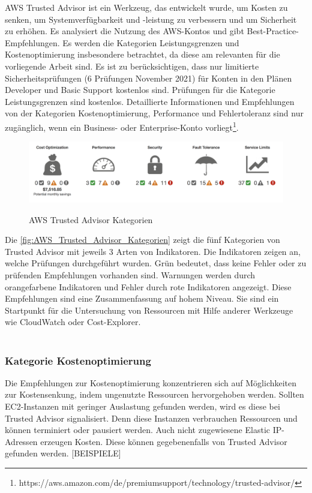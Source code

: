 AWS Trusted Advisor ist ein Werkzeug, das entwickelt wurde, um Kosten zu senken, um Systemverfügbarkeit und -leistung zu verbessern und um Sicherheit zu erhöhen. Es analysiert die Nutzung des AWS-Kontos und gibt Best-Practice-Empfehlungen. Es werden die Kategorien Leistungsgrenzen und Kostenoptimierung insbesondere betrachtet, da diese am relevanten für die vorliegende Arbeit sind. Es ist zu berücksichtigen, dass nur limitierte Sicherheitsprüfungen (6 Prüfungen November 2021) für Konten in den Plänen Developer und Basic Support kostenlos sind. Prüfungen für die Kategorie Leistungsgrenzen sind kostenlos. Detaillierte Informationen und Empfehlungen von der Kategorien Kostenoptimierung, Performance und Fehlertoleranz sind nur zugänglich, wenn ein Business- oder Enterprise-Konto vorliegt\footnote{https://aws.amazon.com/de/premiumsupport/technology/trusted-advisor/}. \\

\begin{figure}[h!]
      \centering
      \includegraphics[scale=0.4]{sources/AWS_Trusted_Advisor_Kategorien}
      \caption[AWS Trusted Advisor Kategorien]{}
      \label{fig:AWS_Trusted_Advisor_Kategorien} 
      AWS Trusted Advisor Kategorien\cite{AMZ20}
\end{figure}
Die \autoref{fig:AWS_Trusted_Advisor_Kategorien} zeigt die fünf Kategorien von Trusted Advisor mit jeweils 3 Arten von Indikatoren. Die Indikatoren zeigen an, welche Prüfungen durchgeführt wurden. Grün bedeutet, dass keine Fehler oder zu prüfenden Empfehlungen vorhanden sind. Warnungen werden durch orangefarbene Indikatoren und Fehler durch rote Indikatoren angezeigt. Diese Empfehlungen sind eine Zusammenfassung auf hohem Niveau. Sie sind ein Startpunkt für die Untersuchung von Ressourcen mit Hilfe anderer Werkzeuge wie CloudWatch oder Cost-Explorer.%
\\\\

\subsubsection*{Kategorie Kostenoptimierung}
Die Empfehlungen zur Kostenoptimierung konzentrieren sich auf Möglichkeiten zur Kostensenkung, indem ungenutzte Ressourcen hervorgehoben werden. 
Sollten EC2-Instanzen mit geringer Auslastung gefunden werden, wird es diese bei Trusted Advisor signalisiert. Denn diese Instanzen verbrauchen Ressourcen und können terminiert oder pausiert werden. %
Auch nicht zugewiesene Elastic IP-Adressen erzeugen Kosten. Diese können gegebenenfalls von Trusted Advisor gefunden werden. %
[BEISPIELE]

